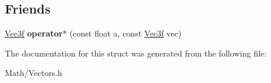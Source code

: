 \subsection*{Friends}
\begin{DoxyCompactItemize}
\item 
\mbox{\label{struct_vec3f_a7565c9c12b41cdb501959bde1649e3e1}} 
\hyperlink{struct_vec3f}{Vec3f} {\bfseries operator$\ast$} (const float a, const \hyperlink{struct_vec3f}{Vec3f} vec)
\end{DoxyCompactItemize}


The documentation for this struct was generated from the following file\+:\begin{DoxyCompactItemize}
\item 
Math/Vectors.\+h\end{DoxyCompactItemize}
